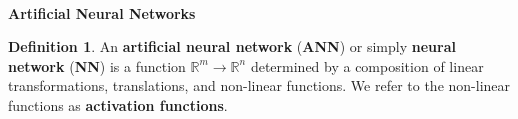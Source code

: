 \documentclass[12pt]{amsart}
\newcommand{\R}{\mathbb{R}}
\theoremstyle{definition}
\newtheorem*{definition}{Definition}
\begin{document}
	
\thispagestyle{fancy}
\pagestyle{fancy}
	
	\
 
\begin{center}
    {\Large \bf {\sc Artificial Neural Networks}}
\end{center}

\begin{definition}
    An \textbf{artificial neural network} (\textbf{ANN}) or simply \textbf{neural network} (\textbf{NN}) is a function $\R^m \to \R^n$ determined by a composition of linear transformations, translations, and non-linear functions. We refer to the non-linear functions as \textbf{activation functions}.
\end{definition}
\end{document}
